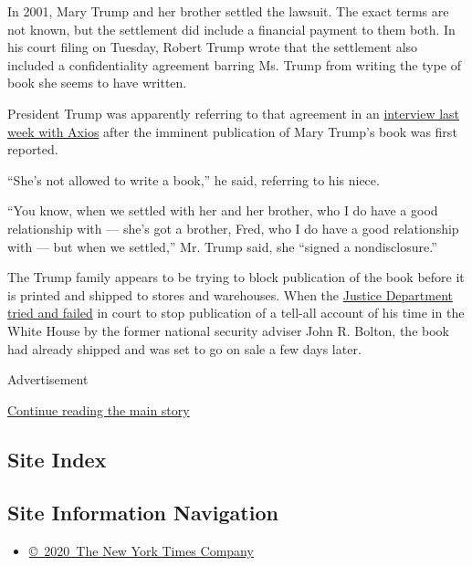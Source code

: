 In 2001, Mary Trump and her brother settled the lawsuit. The exact terms
are not known, but the settlement did include a financial payment to
them both. In his court filing on Tuesday, Robert Trump wrote that the
settlement also included a confidentiality agreement barring Ms. Trump
from writing the type of book she seems to have written.

President Trump was apparently referring to that agreement in an
\href{https://www.axios.com/mary-trump-niece-nondisclosure-f16c90cb-1e75-4d43-bc92-0b6dc589802f.html}{interview
last week with Axios} after the imminent publication of Mary Trump's
book was first reported.

``She's not allowed to write a book,'' he said, referring to his niece.

``You know, when we settled with her and her brother, who I do have a
good relationship with --- she's got a brother, Fred, who I do have a
good relationship with --- but when we settled,'' Mr. Trump said, she
``signed a nondisclosure.''

The Trump family appears to be trying to block publication of the book
before it is printed and shipped to stores and warehouses. When the
\href{https://www.nytimes.com/2020/06/20/us/politics/john-bolton-book-ruling.html}{Justice
Department tried and failed} in court to stop publication of a tell-all
account of his time in the White House by the former national security
adviser John R. Bolton, the book had already shipped and was set to go
on sale a few days later.

Advertisement

\protect\hyperlink{after-bottom}{Continue reading the main story}

\hypertarget{site-index}{%
\subsection{Site Index}\label{site-index}}

\hypertarget{site-information-navigation}{%
\subsection{Site Information
Navigation}\label{site-information-navigation}}

\begin{itemize}
\tightlist
\item
  \href{https://help.nytimes.com/hc/en-us/articles/115014792127-Copyright-notice}{©~2020~The
  New York Times Company}
\end{itemize}

